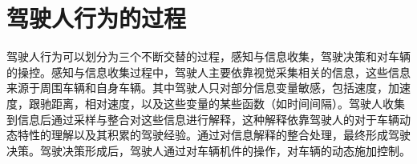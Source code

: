 %
%
% 
%
%
\section{驾驶人行为的过程}
驾驶人行为可以划分为三个不断交替的过程，感知与信息收集，驾驶决策和对车辆的操控。感知与信息收集过程中，驾驶人主要依靠视觉采集相关的信息，这些信息来源于周围车辆和自身车辆。其中驾驶人只对部分信息变量敏感，包括速度，加速度，跟驰距离，相对速度，以及这些变量的某些函数（如时间间隔）。驾驶人收集到信息后通过采样与整合对这些信息进行解释，这种解释依靠驾驶人的对于车辆动态特性的理解以及其积累的驾驶经验。通过对信息解释的整合处理，最终形成驾驶决策。驾驶决策形成后，驾驶人通过对车辆机件的操作，对车辆的动态施加控制。

